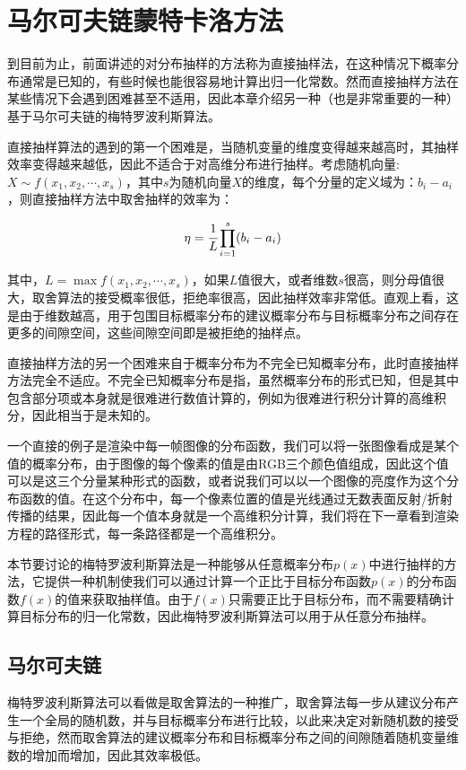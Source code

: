 \section{马尔可夫链蒙特卡洛方法}
到目前为止，前面讲述的对分布抽样的方法称为直接抽样法，在这种情况下概率分布通常是已知的，有些时候也能很容易地计算出归一化常数。然而直接抽样方法在某些情况下会遇到困难甚至不适用，因此本章介绍另一种（也是非常重要的一种）基于马尔可夫链的梅特罗波利斯算法。

直接抽样算法的遇到的第一个困难是，当随机变量的维度变得越来越高时，其抽样效率变得越来越低，因此不适合于对高维分布进行抽样。考虑随机向量: $X\sim f(x_1,x_2,\cdots,x_s )$，其中$s$为随机向量$X$的维度，每个分量的定义域为：$b_i-a_i$，则直接抽样方法中取舍抽样的效率为：

\begin{equation}
	\eta= \cfrac{1}{L}\prod^{s}_{i=1}(b_i-a_i)
\end{equation}

\noindent 其中，$L=\max{f(x_1,x_2,\cdots,x_s)}$，如果$L$值很大，或者维数$s$很高，则分母值很大，取舍算法的接受概率很低，拒绝率很高，因此抽样效率非常低。直观上看，这是由于维数越高，用于包围目标概率分布的建议概率分布与目标概率分布之间存在更多的间隙空间，这些间隙空间即是被拒绝的抽样点。

直接抽样方法的另一个困难来自于概率分布为不完全已知概率分布，此时直接抽样方法完全不适应。不完全已知概率分布是指，虽然概率分布的形式已知，但是其中包含部分项或本身就是很难进行数值计算的，例如为很难进行积分计算的高维积分，因此相当于是未知的。

一个直接的例子是渲染中每一帧图像的分布函数，我们可以将一张图像看成是某个值的概率分布，由于图像的每个像素的值是由RGB三个颜色值组成，因此这个值可以是这三个分量某种形式的函数，或者说我们可以以一个图像的亮度作为这个分布函数的值。在这个分布中，每一个像素位置的值是光线通过无数表面反射/折射传播的结果，因此每一个值本身就是一个高维积分计算，我们将在下一章看到渲染方程的路径形式，每一条路径都是一个高维积分。

本节要讨论的梅特罗波利斯算法是一种能够从任意概率分布$p(x)$中进行抽样的方法，它提供一种机制使我们可以通过计算一个正比于目标分布函数$p(x)$的分布函数$f(x)$的值来获取抽样值。由于$f(x)$只需要正比于目标分布，而不需要精确计算目标分布的归一化常数，因此梅特罗波利斯算法可以用于从任意分布抽样。





\subsection{马尔可夫链}
梅特罗波利斯算法可以看做是取舍算法的一种推广，取舍算法每一步从建议分布产生一个全局的随机数，并与目标概率分布进行比较，以此来决定对新随机数的接受与拒绝，然而取舍算法的建议概率分布和目标概率分布之间的间隙随着随机变量维数的增加而增加，因此其效率极低。

